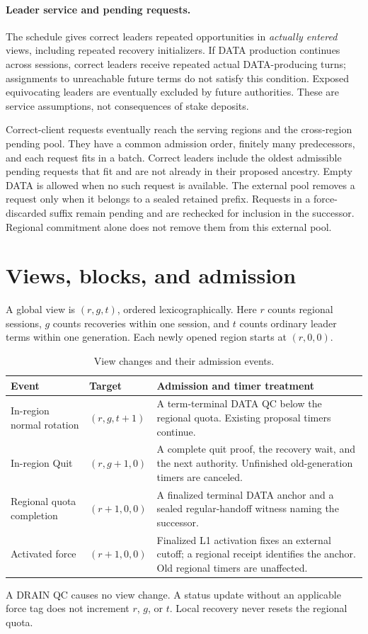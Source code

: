 \documentclass[11pt,a4paper]{article}
\begin{document}
\paragraph{Leader service and pending requests.}
The schedule gives correct leaders repeated opportunities in
\emph{actually entered} views, including repeated recovery initializers.
If DATA production continues across sessions, correct leaders receive
repeated actual DATA-producing turns; assignments to unreachable future
terms do not satisfy this condition. Exposed equivocating leaders are
eventually excluded by future authorities. These are service assumptions,
not consequences of stake deposits.

Correct-client requests eventually reach the serving regions and the
cross-region pending pool. They have a common admission order, finitely
many predecessors, and each request fits in a batch. Correct leaders
include the oldest admissible pending requests that fit and are not
already in their proposed ancestry. Empty DATA is allowed when no such
request is available. The external pool removes a request only when it
belongs to a sealed retained prefix. Requests in a force-discarded suffix
remain pending and are rechecked for inclusion in the successor.
Regional commitment alone does not remove them from this external pool.

\section{Views, blocks, and admission}
\label{sec:definitions}
A global view is $(r,g,t)$, ordered lexicographically. Here $r$ counts
regional sessions, $g$ counts recoveries within one session, and $t$ counts
ordinary leader terms within one generation. Each newly opened region
starts at $(r,0,0)$.

\begin{table}[htbp]\centering\small
\caption{View changes and their admission events.}
\label{tab:views}
\begin{tabularx}{\linewidth}{@{}p{.24\linewidth}p{.27\linewidth}Y@{}}
\toprule
Event & Target & Admission and timer treatment\\
\midrule
In-region normal rotation & $(r,g,t+1)$ & A term-terminal DATA QC below
the regional quota. Existing proposal timers continue.\\
In-region Quit & $(r,g+1,0)$ & A complete quit proof, the recovery wait,
and the next authority. Unfinished old-generation timers are canceled.\\
Regional quota completion & $(r+1,0,0)$ & A finalized terminal DATA anchor
and a sealed regular-handoff witness naming the successor.\\
Activated force & $(r+1,0,0)$ & Finalized L1 activation fixes an external cutoff; a regional
receipt identifies the anchor. Old regional timers are unaffected.\\
\bottomrule
\end{tabularx}
\end{table}
A DRAIN QC causes no view change. A status update without an applicable
force tag does not increment $r$, $g$, or $t$. Local recovery never resets
the regional quota.
\end{document}
